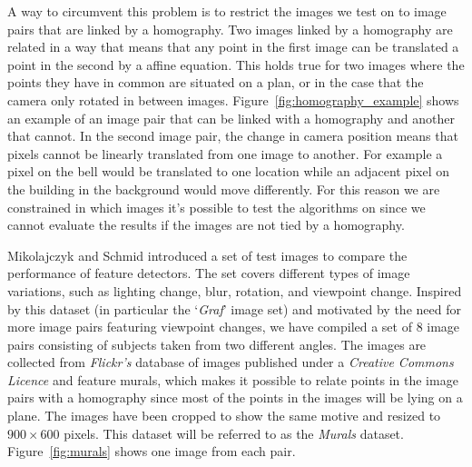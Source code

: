 A way to circumvent this problem is to restrict the images we test on to 
image pairs that are linked by a homography. Two images linked by a 
homography are related in a way that means that any point in the first 
image can be translated a point in the second by a affine equation. This 
holds true for two images where the points they have in common are 
situated on a plan, or in the case that the camera only rotated in 
between images.  Figure~\ref{fig:homography_example} shows an example of 
an image pair that can be linked with a homography and another that 
cannot. In the second image pair, the change in camera position means 
that pixels cannot be linearly translated from one image to another. For 
example a pixel on the bell would be translated to one location while an 
adjacent pixel on the building in the background would
move differently. For this reason we are constrained in which images 
it's possible to test the algorithms on since we cannot evaluate the 
results if the images are not tied by a homography.

Mikolajczyk and Schmid  \cite{mikolajczyk2005performance} introduced a 
set of test images to compare the performance of feature detectors. The 
set covers different types of image variations, such as lighting change, 
blur, rotation, and viewpoint change. Inspired by this dataset (in 
particular the `\emph{Graf}' image set) and motivated by the need for 
more image pairs featuring viewpoint changes, we have compiled a set of 
8 image pairs consisting of subjects taken from two different angles.  
The images are collected from \emph{Flickr's} database of images 
published under a \emph{Creative Commons Licence} and feature murals, 
which makes it possible to relate points in the image pairs with a 
homography since most of the points in the images will be lying on a 
plane.  The images have been cropped to show the same motive and resized 
to $900\times 600$ pixels.  This dataset will be referred to as the 
\emph{Murals} dataset.  Figure~\ref{fig:murals} shows one image from 
each pair.


